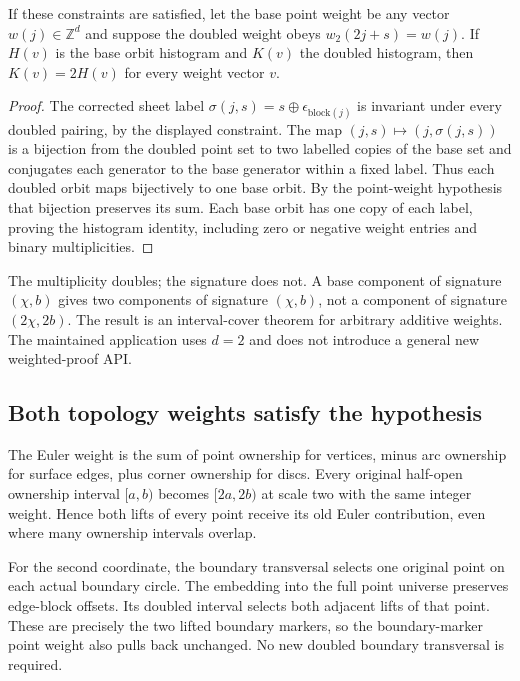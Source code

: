\begin{proposition}
If these constraints are satisfied, let the base point weight be any vector
$w(j)\in\mathbb Z^d$ and suppose the doubled weight obeys
$w_2(2j+s)=w(j)$. If $H(v)$ is the base orbit histogram and $K(v)$ the
doubled histogram, then $K(v)=2H(v)$ for every weight vector $v$.
\end{proposition}
\begin{proof}
The corrected sheet label
$\sigma(j,s)=s\mathbin\oplus\epsilon_{\mathrm{block}(j)}$ is invariant
under every doubled pairing, by the displayed constraint. The map
$(j,s)\mapsto(j,\sigma(j,s))$ is a bijection from the doubled point set to
two labelled copies of the base set and conjugates each generator to the
base generator within a fixed label. Thus each doubled orbit maps
bijectively to one base orbit. By the point-weight hypothesis that bijection
preserves its sum. Each base orbit has one copy of each label, proving the
histogram identity, including zero or negative weight entries and binary
multiplicities.
\end{proof}

The multiplicity doubles; the signature does not. A base component of
signature $(\chi,b)$ gives two components of signature $(\chi,b)$,
not a component of signature $(2\chi,2b)$. The result is an interval-cover
theorem for arbitrary additive weights. The maintained application uses
$d=2$ and does not introduce a general new weighted-proof API.

\subsection{Both topology weights satisfy the hypothesis}

The Euler weight is the sum of point ownership for vertices, minus arc
ownership for surface edges, plus corner ownership for discs. Every original
half-open ownership interval $[a,b)$ becomes $[2a,2b)$ at scale two with
the same integer weight. Hence both lifts of every point receive its old
Euler contribution, even where many ownership intervals overlap.

For the second coordinate, the boundary transversal selects one original
point on each actual boundary circle. The embedding into the full point
universe preserves edge-block offsets. Its doubled interval selects both
adjacent lifts of that point. These are precisely the two lifted boundary
markers, so the boundary-marker point weight also pulls back unchanged.
No new doubled boundary transversal is required.

